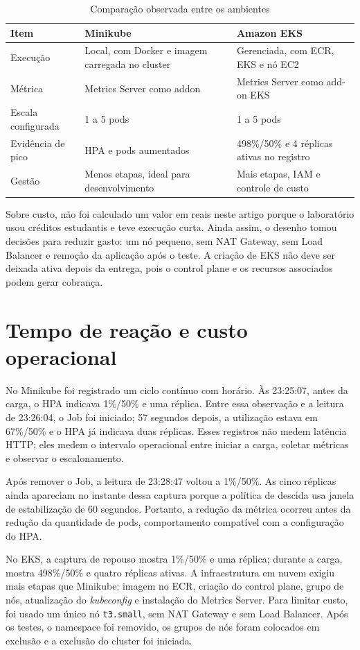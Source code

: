 \documentclass[conference]{IEEEtran}
\begin{document}
\begin{table}[H]
\caption{Comparação observada entre os ambientes}
\label{tab:comparacao}
\centering
\begin{tabular}{p{}p{}p{}}
\toprule
Item & Minikube & Amazon EKS \\
\midrule
Execução & Local, com Docker e imagem carregada no cluster & Gerenciada, com ECR, EKS e nó EC2 \\
Métrica & Metrics Server como addon & Metrics Server como add-on EKS \\
Escala configurada & 1 a 5 pods & 1 a 5 pods \\
Evidência de pico & HPA e pods aumentados & 498\%/50\% e 4 réplicas ativas no registro \\
Gestão & Menos etapas, ideal para desenvolvimento & Mais etapas, IAM e controle de custo \\
\bottomrule
\end{tabular}
\end{table}

Sobre custo, não foi calculado um valor em reais neste artigo porque o laboratório usou créditos estudantis e teve execução curta. Ainda assim, o desenho tomou decisões para reduzir gasto: um nó pequeno, sem NAT Gateway, sem Load Balancer e remoção da aplicação após o teste. A criação de EKS não deve ser deixada ativa depois da entrega, pois o control plane e os recursos associados podem gerar cobrança.

\section{Tempo de reação e custo operacional}
No Minikube foi registrado um ciclo contínuo com horário. Às 23:25:07, antes da carga, o HPA indicava 1\%/50\% e uma réplica. Entre essa observação e a leitura de 23:26:04, o Job foi iniciado; 57 segundos depois, a utilização estava em 67\%/50\% e o HPA já indicava duas réplicas. Esses registros não medem latência HTTP; eles medem o intervalo operacional entre iniciar a carga, coletar métricas e observar o escalonamento.

Após remover o Job, a leitura de 23:28:47 voltou a 1\%/50\%. As cinco réplicas ainda apareciam no instante dessa captura porque a política de descida usa janela de estabilização de 60 segundos. Portanto, a redução da métrica ocorreu antes da redução da quantidade de pods, comportamento compatível com a configuração do HPA.

No EKS, a captura de repouso mostra 1\%/50\% e uma réplica; durante a carga, mostra 498\%/50\% e quatro réplicas ativas. A infraestrutura em nuvem exigiu mais etapas que Minikube: imagem no ECR, criação do control plane, grupo de nós, atualização do \textit{kubeconfig} e instalação do Metrics Server. Para limitar custo, foi usado um único nó \texttt{t3.small}, sem NAT Gateway e sem Load Balancer. Após os testes, o namespace foi removido, os grupos de nós foram colocados em exclusão e a exclusão do cluster foi iniciada.
\end{document}
